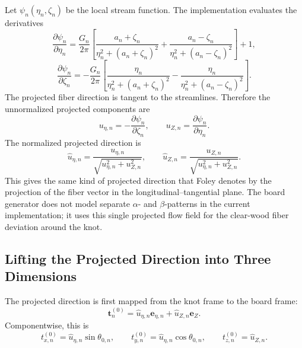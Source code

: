 \documentclass[11pt]{article}
\begin{document}
Let $\psi_n(\eta_n,\zeta_n)$ be the local stream function. The implementation evaluates the derivatives
\begin{equation}
\frac{\partial \psi_n}{\partial \eta_n}
=
\frac{G_n}{2\pi}
\left[
\frac{a_n + \zeta_n}{\eta_n^2 + (a_n + \zeta_n)^2}
+
\frac{a_n - \zeta_n}{\eta_n^2 + (a_n - \zeta_n)^2}
\right]
+1,
\end{equation}
\begin{equation}
\frac{\partial \psi_n}{\partial \zeta_n}
=
-\frac{G_n}{2\pi}
\left[
\frac{\eta_n}{\eta_n^2 + (a_n + \zeta_n)^2}
-
\frac{\eta_n}{\eta_n^2 + (a_n - \zeta_n)^2}
\right].
\end{equation}
The projected fiber direction is tangent to the streamlines. Therefore the unnormalized projected components
are
\begin{equation}
u_{\eta,n}=-\frac{\partial \psi_n}{\partial \zeta_n},
\qquad
u_{Z,n}=\frac{\partial \psi_n}{\partial \eta_n}.
\end{equation}
The normalized projected direction is
\begin{equation}
\widehat{u}_{\eta,n}
=
\frac{u_{\eta,n}}{\sqrt{u_{\eta,n}^2+u_{Z,n}^2}},
\qquad
\widehat{u}_{Z,n}
=
\frac{u_{Z,n}}{\sqrt{u_{\eta,n}^2+u_{Z,n}^2}}.
\end{equation}
This gives the same kind of projected direction that Foley denotes by the projection of the fiber vector in the
longitudinal--tangential plane. The board generator does not model separate $\alpha$- and $\beta$-patterns in
the current implementation; it uses this single projected flow field for the clear-wood fiber deviation around
the knot.

\subsection{Lifting the Projected Direction into Three Dimensions}

The projected direction is first mapped from the knot frame to the board frame:
\begin{equation}
\bm{t}^{(0)}_n
=
\widehat{u}_{\eta,n}\bm{e}_{\eta,n}
+
\widehat{u}_{Z,n}\bm{e}_Z.
\end{equation}
Componentwise, this is
\begin{equation}
t^{(0)}_{x,n}=\widehat{u}_{\eta,n}\sin\theta_{0,n},
\qquad
t^{(0)}_{y,n}=\widehat{u}_{\eta,n}\cos\theta_{0,n},
\qquad
t^{(0)}_{z,n}=\widehat{u}_{Z,n}.
\end{equation}
\end{document}
